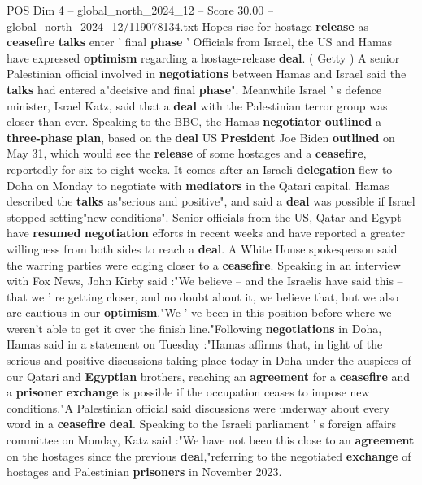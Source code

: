 \begin{textsample}{POS Dim 4 – global\_north\_2024\_12 – Score 30.00 – global\_north\_2024\_12/119078134.txt}  \label{ex:f4_pos_302}
Hopes rise for hostage \textbf{release} as \textbf{ceasefire} \textbf{talks} enter ' final \textbf{phase} ' Officials from Israel, the US and Hamas have expressed \textbf{optimism} regarding a hostage-release \textbf{deal}. ( Getty ) A senior Palestinian official involved in \textbf{negotiations} between Hamas and Israel said the \textbf{talks} had entered a"decisive and final \textbf{phase}".
Meanwhile Israel ' s defence minister, Israel Katz, said that a \textbf{deal} with the Palestinian terror group was closer than ever.
Speaking to the BBC, the Hamas \textbf{negotiator} \textbf{outlined} a \textbf{three-phase} \textbf{plan}, based on the \textbf{deal} US \textbf{President} Joe Biden \textbf{outlined} on May 31, which would see the \textbf{release} of some hostages and a \textbf{ceasefire}, reportedly for six to eight weeks.
It comes after an Israeli \textbf{delegation} flew to Doha on Monday to negotiate with \textbf{mediators} in the Qatari capital.
Hamas described the \textbf{talks} as"serious and positive", and said a \textbf{deal} was possible if Israel stopped setting"new conditions".
Senior officials from the US, Qatar and Egypt have \textbf{resumed} \textbf{negotiation} efforts in recent weeks and have reported a greater willingness from both sides to reach a \textbf{deal}.
A White House spokesperson said the warring parties were edging closer to a \textbf{ceasefire}.
Speaking in an interview with Fox News, John Kirby said :"We believe -- and the Israelis have said this -- that we ' re getting closer, and no doubt about it, we believe that, but we also are cautious in our \textbf{optimism}."We ' ve been in this position before where we weren't able to get it over the finish line."Following \textbf{negotiations} in Doha, Hamas said in a statement on Tuesday :"Hamas affirms that, in light of the serious and positive discussions taking place today in Doha under the auspices of our Qatari and \textbf{Egyptian} brothers, reaching an \textbf{agreement} for a \textbf{ceasefire} and a \textbf{prisoner} \textbf{exchange} is possible if the occupation ceases to impose new conditions."A Palestinian official said discussions were underway about every word in a \textbf{ceasefire} \textbf{deal}.
Speaking to the Israeli parliament ' s foreign affairs committee on Monday, Katz said :"We have not been this close to an \textbf{agreement} on the hostages since the previous \textbf{deal},"referring to the negotiated \textbf{exchange} of hostages and Palestinian \textbf{prisoners} in November 2023.

\end{textsample}
